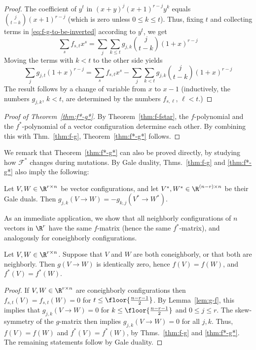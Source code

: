 \begin{proof}
The coefficient of $y^t$ in $(x+y)^j (x+1)^{r-j}y^k$ equals $\binom{j}{t-k}(x+1)^{r-j}$ (which is zero unless $0\leq k\leq t$). Thus, fixing $t$ and collecting terms in \eqref{eq:f-g-to-be-inverted} according to $y^t$, we get
\[
\sum_s f_{s,t} x^s =\sum_j \sum_{k\leq t} g_{j,k}\binom{j}{t-k}(1+x)^{r-j}
\]
Moving the terms with $k<t$ to the other side yields
\[
\sum_j g_{j,t} (1+x)^{r-j} = \sum_s f_{s,t} x^s - \sum_j \sum_{k<t} g_{j,k}\binom{j}{t-k}(1+x)^{r-j}
\]
The result follows by a change of variable from $x$ to $x-1$ (inductively, the numbers $g_{j,k}$, $k<t$, are determined by the numbers $f_{s,\ell}$, $\ell<t$.)
\end{proof}
%
\begin{proof}[Proof of Theorem~\ref{thm:f*-g*}] 
By Theorem~\ref{thm:f-fstar}, the $f$-polynomial and the $f^*$-polynomial of a vector configuration determine each other. By combining this with Thm.~\ref{thm:f-g}, Theorem~\ref{thm:f*-g*} follows.\end{proof}
%
We remark that Theorem~\ref{thm:f*-g*} can also be proved directly, by studying how $\mathcal{F}^*$ changes during mutations. By Gale duality, Thms.~\ref{thm:f-g} and \ref{thm:f*-g*} also imply the following:
%
\begin{corollary}
\label{cor:g-pair-dual}
Let $V,W\in \R^{r\times n}$ be vector configurations, and let $V^*,W^*\in  \R^{(n-r)\times n}$ be their Gale duals. Then $g_{j,k}(V \to W) = -g_{k,j}(V^* \to W^*)$.
\end{corollary}
%
As an immediate application, we show that all neighborly configurations of $n$ vectors in $\R^r$ have the same $f$-matrix (hence the same $f^*$-matrix), and analogously for coneighborly configurations.
\begin{proposition}
\label{prop:f-neighborly-coneighborly}
Let $V,W \in \R^{r\times n}$. Suppose that $V$ and $W$ are both coneighborly, or that both are neighborly. Then $g(V\to W)$ is identically zero, hence $f(V)=f(W)$, and $f^*(V)=f^*(W)$.
\end{proposition}
\begin{proof} 
If $V,W \in \R^{r\times n}$ are coneighborly configurations then $f_{s,t}(V)=f_{s,t}(W)=0$ for $t \leq \floor{\frac{n-r-1}{2}}$. By Lemma~\ref{lem:g-f}, this implies that $g_{j,k}(V\to W)=0$ for $k\leq  \floor{\frac{n-r-1}{2}}$ and $0\leq j\leq r$. The skew-symmetry of the $g$-matrix then implies  $g_{j,k}(V\to W)=0$ for all $j,k$. Thus, $f(V)=f(W)$ and $f^*(V)=f^*(W)$, by Thms.~\ref{thm:f-g} and \ref{thm:f*-g*}. The remaining statements follow by Gale duality.
\end{proof}
%
%
